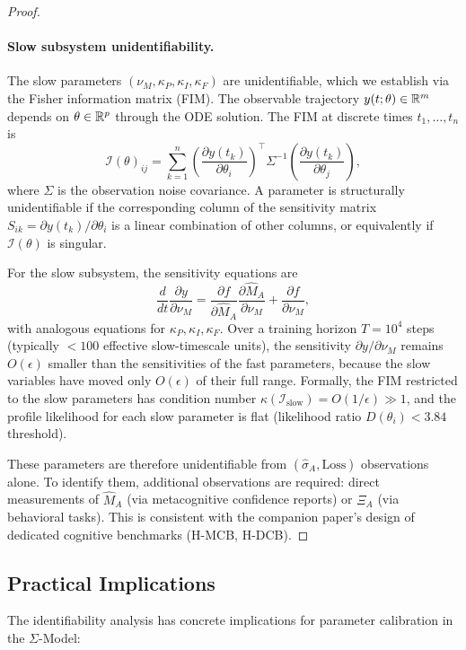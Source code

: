 \begin{proof}
\paragraph{Slow subsystem unidentifiability.}
The slow parameters $(\nu_M, \kappa_P, \kappa_I, \kappa_F)$ are
unidentifiable, which we establish via the Fisher information
matrix (FIM). The observable trajectory $y(t; \theta) \in \mathbb{R}^m$ depends
on $\theta \in \mathbb{R}^p$ through the ODE solution.
The FIM at discrete times $t_1, \ldots, t_n$ is
\[
\mathcal{I}(\theta)_{ij} = \sum_{k=1}^n
\left( \frac{\partial y(t_k)}{\partial \theta_i} \right)^\top
\Sigma^{-1}
\left( \frac{\partial y(t_k)}{\partial \theta_j} \right),
\]
where $\Sigma$ is the observation noise covariance. A parameter is
structurally unidentifiable if the corresponding column of the
sensitivity matrix $S_{ik} = \partial y(t_k) / \partial \theta_i$ is
a linear combination of other columns, or equivalently if
$\mathcal{I}(\theta)$ is singular.

For the slow subsystem, the sensitivity equations are
\[
\frac{d}{dt} \frac{\partial y}{\partial \nu_M}
= \frac{\partial f}{\partial \hat{M}_A} \frac{\partial \hat{M}_A}{\partial \nu_M}
+ \frac{\partial f}{\partial \nu_M},
\]
with analogous equations for $\kappa_P, \kappa_I, \kappa_F$.
Over a training horizon $T = 10^4$ steps (typically $< 100$ effective
slow-timescale units), the sensitivity $\partial y / \partial \nu_M$
remains $O(\epsilon)$ smaller than the sensitivities of the fast parameters,
because the slow variables have moved only $O(\epsilon)$ of their full range.
Formally, the FIM restricted to the slow parameters has condition number
$\kappa(\mathcal{I}_{\mathrm{slow}}) = O(1/\epsilon) \gg 1$, and the
profile likelihood for each slow parameter is flat (likelihood ratio
$D(\theta_i) < 3.84$ threshold).

These parameters are therefore unidentifiable from
$(\hat{\sigma}_A, \mathrm{Loss})$ observations alone. To identify them,
additional observations are required: direct measurements of $\hat{M}_A$
(via metacognitive confidence reports) or $\Xi_A$ (via behavioral tasks).
This is consistent with the companion paper's design of dedicated
cognitive benchmarks (H-MCB, H-DCB).
\end{proof}

\subsection{Practical Implications}

The identifiability analysis has concrete implications for parameter
calibration in the $\Sigma$-Model:

